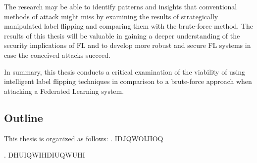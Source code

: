 The research may be able to identify patterns and insights that conventional methods of attack might miss by examining the results of strategically manipulated label flipping and comparing them with the brute-force method.
The results of this thesis will be valuable in gaining a deeper understanding of the security implications of FL and to develop more robust and secure FL systems in case the conceived attacks succeed.


In summary, this thesis conducts a critical examination of the viability of using intelligent label flipping techniques in comparison to a brute-force approach when attacking a Federated Learning system.

\subsection{Outline}
This thesis is organized as follows:
. IDJQWOIJIOQ

. DHUIQWIHDIUQWUHI
\pagebreak